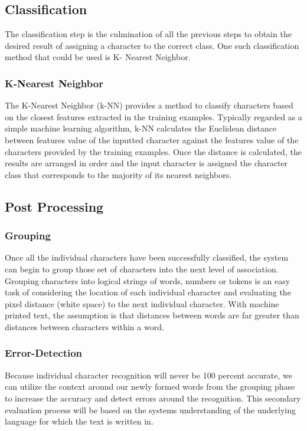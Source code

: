 \subsection{Classification}

The classification step is the culmination of all the previous steps to obtain the desired result of assigning a character to the correct class. One such classification method that could be used is K- Nearest Neighbor.

\subsubsection{K-Nearest Neighbor}
The K-Nearest Neighbor (k-NN) provides a method to classify characters based on the closest features extracted in the training examples. Typically regarded as a simple machine learning algorithm, k-NN calculates the Euclidean distance between features value of the inputted character against the features value of the characters provided by the training examples. Once the distance is calculated, the results are arranged in order and the input character is assigned the character class that corresponds to the majority of its nearest neighbors\cite{hid-sp18-414-www-featureextraction}.


\subsection{Post Processing}


\subsubsection{Grouping}

Once all the individual characters have been successfully classified, the system can begin to group those set of characters into the next level of association. Grouping characters into logical strings of words, numbers or tokens is an easy task of considering the location of each individual character and evaluating the pixel distance (white space) to the next individual character. With machine printed text, the assumption is that distances between words are far greater than distances between characters within a word. 

\subsubsection{Error-Detection}

Because individual character recognition will never be 100 percent accurate, we can utilize the context around our newly formed words from the grouping phase to increase the accuracy and detect errors around the recognition. This secondary evaluation process will be based on the systems understanding of the underlying language for which the text is written in.

